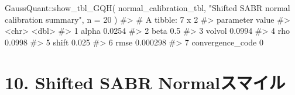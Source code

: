 \documentclass[
  letterpaper,
  DIV=11,
  numbers=noendperiod]{scrreprt}
\newenvironment{Shaded}{\begin{snugshade}}{\end{snugshade}}
\newcommand{\AttributeTok}[1]{\textcolor[rgb]{0.40,0.45,0.13}{#1}}
\newcommand{\CommentTok}[1]{\textcolor[rgb]{0.37,0.37,0.37}{#1}}
\newcommand{\DecValTok}[1]{\textcolor[rgb]{0.68,0.00,0.00}{#1}}
\newcommand{\FunctionTok}[1]{\textcolor[rgb]{0.28,0.35,0.67}{#1}}
\newcommand{\NormalTok}[1]{\textcolor[rgb]{0.00,0.23,0.31}{#1}}
\newcommand{\SpecialCharTok}[1]{\textcolor[rgb]{0.37,0.37,0.37}{#1}}
\newcommand{\StringTok}[1]{\textcolor[rgb]{0.13,0.47,0.30}{#1}}
\begin{document}
\begin{Shaded}
\begin{Highlighting}[]
\NormalTok{GaussQuant}\SpecialCharTok{::}\FunctionTok{show\_tbl\_GQH}\NormalTok{(}
\NormalTok{  normal\_calibration\_tbl,}
  \StringTok{"Shifted SABR normal calibration summary"}\NormalTok{,}
  \AttributeTok{n =} \DecValTok{20}
\NormalTok{)}
\CommentTok{\#\textgreater{} \# A tibble: 7 x 2}
\CommentTok{\#\textgreater{}   parameter           value}
\CommentTok{\#\textgreater{}   \textless{}chr\textgreater{}               \textless{}dbl\textgreater{}}
\CommentTok{\#\textgreater{} 1 alpha            0.0254  }
\CommentTok{\#\textgreater{} 2 beta             0.5     }
\CommentTok{\#\textgreater{} 3 volvol           0.0994  }
\CommentTok{\#\textgreater{} 4 rho              0.0998  }
\CommentTok{\#\textgreater{} 5 shift            0.025   }
\CommentTok{\#\textgreater{} 6 rmse             0.000298}
\CommentTok{\#\textgreater{} 7 convergence\_code 0}
\end{Highlighting}
\end{Shaded}

\section{10. Shifted SABR
Normalスマイル}\label{shifted-sabr-normalux30b9ux30deux30a4ux30eb}
\end{document}
